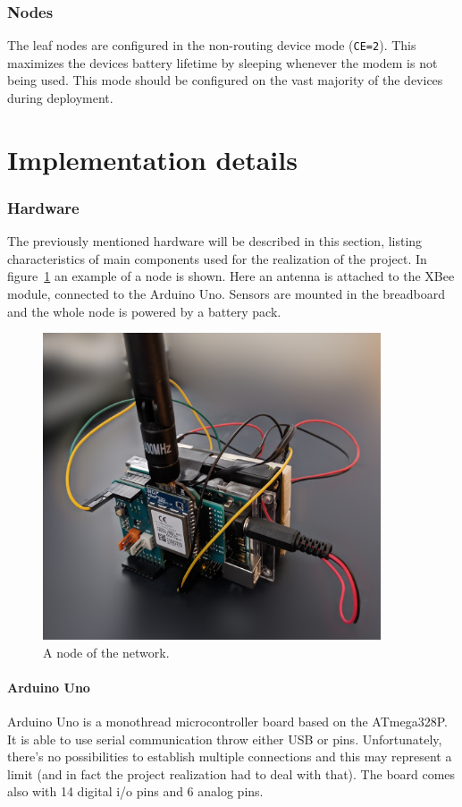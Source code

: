 \documentclass[a4paper,11pt]{scrartcl}
\begin{document}
\section{Nodes}
The leaf nodes are configured in the non-routing device mode (\texttt{CE=2}). This maximizes the devices battery lifetime by sleeping whenever the modem is not being used. This mode should be configured on the vast majority of the devices during deployment.

\part{Implementation details}
\section{Hardware}
The previously mentioned hardware will be described in this section, listing characteristics of main components used for the realization of the project. In figure~\ref{fig:node} an example of a node is shown. Here an antenna is attached to the XBee module, connected to the Arduino Uno. Sensors are mounted in the breadboard and the whole node is powered by a battery pack.

\begin{figure}
    \centering
    \includegraphics[width=10cm]{hardware}
    \caption{A node of the network.}
    \label{fig:node}
\end{figure}

\subsection{Arduino Uno}
Arduino Uno is a monothread microcontroller board based on the ATmega328P. It is able to use serial communication throw either USB or pins. Unfortunately, there's no possibilities to establish multiple connections and this may represent a limit (and in fact the project realization had to deal with that). The board comes also with 14 digital i/o pins and 6 analog pins.
\end{document}
